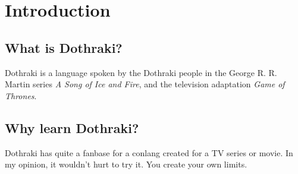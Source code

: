 \chapter*{Introduction}
\section*{What is Dothraki?}
Dothraki is a language spoken by the Dothraki people in the George R. R. Martin
series \textit{A Song of Ice and Fire}, and the television adaptation
\textit{Game of Thrones}.
\section*{Why learn Dothraki?}
Dothraki has quite a fanbase for a conlang created for a TV series or movie. In my
opinion, it wouldn't hurt to try it. You create your own limits.

